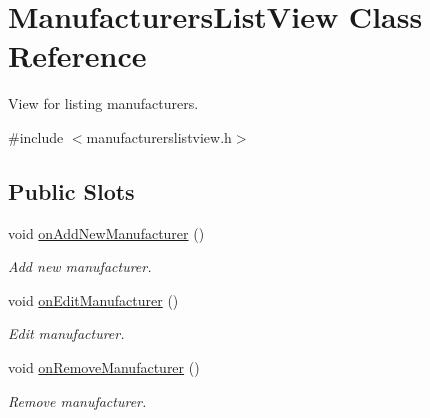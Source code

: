 \hypertarget{class_manufacturers_list_view}{\section{\-Manufacturers\-List\-View \-Class \-Reference}
\label{class_manufacturers_list_view}
}


\-View for listing manufacturers.  




{\ttfamily \#include $<$manufacturerslistview.\-h$>$}

\subsection*{\-Public \-Slots}
\begin{DoxyCompactItemize}
\item 
void \hyperlink{class_manufacturers_list_view_a70aa46e38fd9b4430a3ab34c8610599c}{on\-Add\-New\-Manufacturer} ()
\begin{DoxyCompactList}\small\item\em \-Add new manufacturer. \end{DoxyCompactList}\item 
void \hyperlink{class_manufacturers_list_view_a12a074e800acd16d05fe63a80b80abee}{on\-Edit\-Manufacturer} ()
\begin{DoxyCompactList}\small\item\em \-Edit manufacturer. \end{DoxyCompactList}\item 
void \hyperlink{class_manufacturers_list_view_a07a080a600b413977435713be3e0a7a3}{on\-Remove\-Manufacturer} ()
\begin{DoxyCompactList}\small\item\em \-Remove manufacturer. \end{DoxyCompactList}\end{DoxyCompactItemize}

